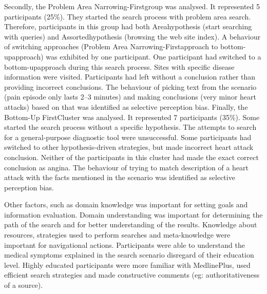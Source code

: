 \documentclass[]{article}
\begin{document}
\begin{enumerate}
Secondly, the \textquotesingle Problem Area Narrowing-First\textquotesingle group was analysed. It represented 5 participants (25\%). They started the search process with problem area search. Therefore, participants in this group had both \textquotesingle Area\textquotesingle hypothesis (start searching with queries) and \textquotesingle Assorted\textquotesingle hypothesis (browsing the web site index). A behaviour of switching approaches (\textquotesingle Problem Area Narrowing-First\textquotesingle approach to \textquotesingle bottom-up\textquotesingle approach) was exhibited by one participant. One participant had switched to a \textquotesingle bottom-up\textquotesingle approach during this search process. Sites with specific disease information were visited. Participants had left without a conclusion rather than providing incorrect conclusions. The behaviour of picking text from the scenario (pain episode only lasts 2–3 minutes) and making conclusions (very minor heart attacks) based on that was identified as \textquotesingle selective perception bias\textquotesingle. Finally, the \textquotesingle Bottom-Up First\textquotesingle  Cluster was analysed. It represented 7 participants (35\%). Some started the search process without a specific hypothesis. The attempts to search for a general-purpose diagnostic tool were unsuccessful. Some participants had  switched to other \textquotesingle hypothesis-driven strategies\textquotesingle, but made incorrect heart attack conclusion. Neither of the participants in this cluster had made the exact correct conclusion as angina. The behaviour of trying to match description of a heart attack with the facts mentioned in the scenario was identified as \textquotesingle selective perception bias\textquotesingle.                      

Other factors, such as domain knowledge was important for setting goals and information evaluation. Domain understanding was important for determining the path of the search and for better understanding of the results. Knowledge about resources, strategies used to perform searches and meta-knowledge were important for navigational actions. Participants were able to understand the medical symptoms explained in the search scenario disregard of their education level. Highly educated participants were more familiar with MedlinePlus, used efficient search strategies and made constructive comments (eg: authoritativeness of a source).  


\end{enumerate}
\end{document}
